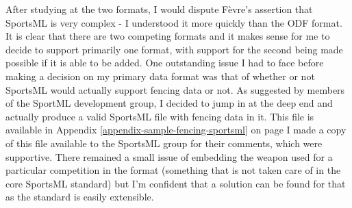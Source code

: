 After studying at the two formats, I would dispute F\`{e}vre's assertion that
SportsML is very complex - I understood it more quickly than the ODF format.
It is clear that there are two competing formats and it makes sense for me to
decide to support primarily one format, with support for the second being made
possible if it is able to be added.
One outstanding issue I had to face before making a decision on my primary data
format was that of whether or not SportsML would actually support fencing data
or not. As suggested by members of the SportML development group, I decided to
jump in at the deep end and actually produce a valid SportsML file with fencing
data in it. This file is available in Appendix
\ref{appendix-sample-fencing-sportsml} on page
\pageref{appendix-sample-fencing-sportsml} I made a copy of this file available
to the SportsML group for their comments, which were supportive. There remained
a small issue of embedding the weapon used for a particular competition in the
format (something that is not taken care of in the core SportsML standard) but
I'm confident that a solution can be found for that as the standard is easily
extensible.
